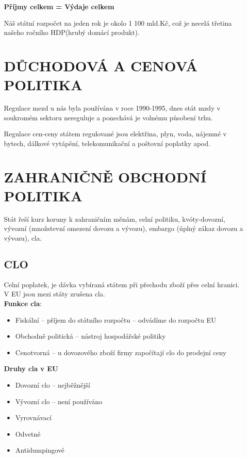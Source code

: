 \begin{center}
    \textbf{Příjmy celkem = Výdaje celkem}
\end{center}

Náš státní rozpočet na jeden rok je okolo 1 100 mld.Kč, což je necelá třetina našeho ročního HDP(hrubý domácí produkt).

\section*{DŮCHODOVÁ A CENOVÁ POLITIKA}

Regulace mezd u nás byla používána v roce 1990-1995, dnes stát mzdy v soukromém sektoru nereguluje a ponechává je volnému působení trhu.

Regulace cen-ceny státem regulované jsou elektřina, plyn, voda, nájemné v bytech, dálkové vytápění, telekomunikační a poštovní poplatky apod.

\section*{ZAHRANIČNĚ OBCHODNÍ POLITIKA}

Stát řeší kurz koruny k zahraničním měnám, celní politiku, kvóty-dovozní, vývozní (množstevní omezení dovozu a vývozu), embargo (úplný zákaz dovozu a vývozu), cla.

\subsection*{CLO}

Celní poplatek, je dávka vybíraná státem při přechodu zboží přes celní hranici. \\
V EU jsou mezi státy zrušena cla. \\
\textbf{Funkce cla}:
\begin{itemize}
    \item Fiskální -- příjem do státního rozpočtu -- odvádíme do rozpočtu EU
    \item Obchodně politická -- nástroj hospodářské politiky
    \item Cenotvorná -- u dovozového zboží firmy započítají clo do prodejní ceny
\end{itemize}

\textbf{Druhy cla v EU}
\begin{itemize}
    \item Dovozní clo -- nejběžnější
    \item Vývozní clo -- není používáno
    \item Vyrovnávací
    \item Odvetné
    \item Antidumpingové
\end{itemize}

